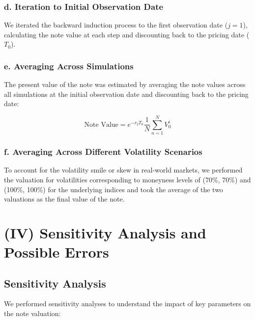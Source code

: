 \documentclass[12pt,a4paper]{article}
\begin{document}
\subsubsection*{d. Iteration to Initial Observation Date}

We iterated the backward induction process to the first observation date (\( j = 1 \)), calculating the note value at each step and discounting back to the pricing date (\( T_0 \)).

\subsubsection*{e. Averaging Across Simulations}

The present value of the note was estimated by averaging the note values across all simulations at the initial observation date and discounting back to the pricing date:

\[
\text{Note Value} = e^{-r_2 T_0} \frac{1}{N} \sum_{n=1}^{N} V^{i}_{0}
\]

\subsubsection*{f. Averaging Across Different Volatility Scenarios}

To account for the volatility smile or skew in real-world markets, we performed the valuation for volatilities corresponding to moneyness levels of (70\%, 70\%) and (100\%, 100\%) for the underlying indices and took the average of the two valuations as the final value of the note.



\section*{(IV) Sensitivity Analysis and Possible Errors}

\subsection*{Sensitivity Analysis}

We performed sensitivity analyses to understand the impact of key parameters on the note valuation:
\end{document}
